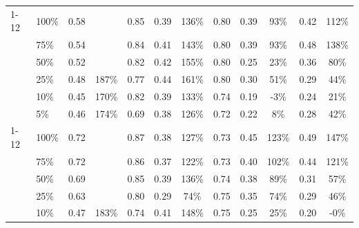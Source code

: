 \begin{longtable}{llcccccccccc}
\cmidrule(l){1-12}
\multirow{6}{*}{qwen} & 100\% & 0.58 & \cellcolor{tablegreen!70}\textcolor{white}{246\%} & 0.85 & 0.39 & \cellcolor{tablegreen!39}136\% & 0.80 & 0.39 & \cellcolor{tablegreen!27}93\% & 0.42 & \cellcolor{tablegreen!32}112\% \\
 & 75\% & 0.54 & \cellcolor{tablegreen!64}\textcolor{white}{223\%} & 0.84 & 0.41 & \cellcolor{tablegreen!41}143\% & 0.80 & 0.39 & \cellcolor{tablegreen!26}93\% & 0.48 & \cellcolor{tablegreen!40}138\% \\
 & 50\% & 0.52 & \cellcolor{tablegreen!61}\textcolor{white}{213\%} & 0.82 & 0.42 & \cellcolor{tablegreen!44}155\% & 0.80 & 0.25 & \cellcolor{tablegreen!7}23\% & 0.36 & \cellcolor{tablegreen!23}80\% \\
 & 25\% & 0.48 & \cellcolor{tablegreen!53}187\% & 0.77 & 0.44 & \cellcolor{tablegreen!46}161\% & 0.80 & 0.30 & \cellcolor{tablegreen!15}51\% & 0.29 & \cellcolor{tablegreen!13}44\% \\
 & 10\% & 0.45 & \cellcolor{tablegreen!49}170\% & 0.82 & 0.39 & \cellcolor{tablegreen!38}133\% & 0.74 & 0.19 & \cellcolor[HTML]{E8A0A0}-3\% & 0.24 & \cellcolor{tablegreen!6}21\% \\
 & 5\% & 0.46 & \cellcolor{tablegreen!50}174\% & 0.69 & 0.38 & \cellcolor{tablegreen!36}126\% & 0.72 & 0.22 & \cellcolor{tablegreen!2}8\% & 0.28 & \cellcolor{tablegreen!12}42\% \\
\cmidrule(l){1-12}
\multirow{6}{*}{granite} & 100\% & 0.72 & \cellcolor{tablegreen!95}\textcolor{white}{332\%} & 0.87 & 0.38 & \cellcolor{tablegreen!36}127\% & 0.73 & 0.45 & \cellcolor{tablegreen!35}123\% & 0.49 & \cellcolor{tablegreen!42}147\% \\
 & 75\% & 0.72 & \cellcolor{tablegreen!95}\textcolor{white}{331\%} & 0.86 & 0.37 & \cellcolor{tablegreen!35}122\% & 0.73 & 0.40 & \cellcolor{tablegreen!29}102\% & 0.44 & \cellcolor{tablegreen!35}121\% \\
 & 50\% & 0.69 & \cellcolor{tablegreen!90}\textcolor{white}{315\%} & 0.85 & 0.39 & \cellcolor{tablegreen!39}136\% & 0.74 & 0.38 & \cellcolor{tablegreen!25}89\% & 0.31 & \cellcolor{tablegreen!16}57\% \\
 & 25\% & 0.63 & \cellcolor{tablegreen!80}\textcolor{white}{278\%} & 0.80 & 0.29 & \cellcolor{tablegreen!21}74\% & 0.75 & 0.35 & \cellcolor{tablegreen!21}74\% & 0.29 & \cellcolor{tablegreen!13}46\% \\
 & 10\% & 0.47 & \cellcolor{tablegreen!52}183\% & 0.74 & 0.41 & \cellcolor{tablegreen!42}148\% & 0.75 & 0.25 & \cellcolor{tablegreen!7}25\% & 0.20 & \cellcolor[HTML]{E8A0A0}-0\% \\

\end{longtable}
